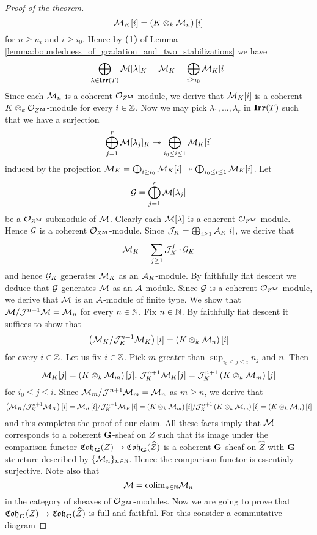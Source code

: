 \begin{proof}[Proof of the theorem]
$${\mathcal M}_K[i] = \left(K\otimes_k{\mathcal M}_n\right)[i]$$
for $n\geq n_i$ and $i\geq i_0$. Hence by \textbf{(1)} of Lemma \ref{lemma:boundedness_of_gradation_and_two_stabilizations} we have
$$\bigoplus_{\lambda\in \mathbf{Irr}(T)}{\mathcal M}[\lambda]_K = {\mathcal M}_K = \bigoplus_{i\geq i_0}{\mathcal M}_K[i]$$
Since each ${\mathcal M}_n$ is a coherent ${\mathcal O}_{Z^{\mathbf{M}}}$-module, we derive that ${\mathcal M}_K[i]$ is a coherent $K\otimes_k{\mathcal O}_{Z^{\mathbf{M}}}$-module for every $i\in {\mathbb Z}$. Now we may pick $\lambda_1,...,\lambda_r$ in $\mathbf{Irr}(T)$ such that we have a surjection
$$\bigoplus_{j=1}^r{\mathcal M}[\lambda_j]_K \twoheadrightarrow \bigoplus_{i_0\leq i\leq 1}{\mathcal M}_K[i]$$
induced by the projection ${\mathcal M}_K = \bigoplus_{i\geq i_0}{\mathcal M}_K[i]\twoheadrightarrow \bigoplus_{i_0\leq i\leq 1}{\mathcal M}_K[i]$. Let
$${\mathcal G} = \bigoplus_{j=1}^r{\mathcal M}[\lambda_j]$$
be a ${\mathcal O}_{Z^{\mathbf{M}}}$-submodule of ${\mathcal M}$. Clearly each ${\mathcal M}[\lambda]$ is a coherent ${\mathcal O}_{Z^{\mathbf{M}}}$-module. Hence ${\mathcal G}$ is a coherent ${\mathcal O}_{Z^{\mathbf{M}}}$-module. Since ${\mathcal J}_K = \bigoplus_{i\geq 1}{\mathcal A}_K[i]$, we derive that
$${\mathcal M}_K = \sum_{j\geq 1}{\mathcal J}_K^j\cdot {\mathcal G}_K$$
and hence ${\mathcal G}_K$ generates ${\mathcal M}_K$ as an ${\mathcal A}_K$-module. By faithfully flat descent we deduce that ${\mathcal G}$ generates ${\mathcal M}$ as an ${\mathcal A}$-module. Since ${\mathcal G}$ is a coherent ${\mathcal O}_{Z^{\mathbf{M}}}$-module, we derive that ${\mathcal M}$ is an ${\mathcal A}$-module of finite type. We show that  ${\mathcal M}/{\mathcal J}^{n+1}{\mathcal M} = {\mathcal M}_{n}$ for every $n\in {\mathbb N}$. Fix $n\in {\mathbb N}$. By faithfully flat descent it suffices to show that
$$\left({\mathcal M}_K/{\mathcal J}_K^{n+1}{\mathcal M}_K\right)[i] = \left(K\otimes_k{\mathcal M}_n\right)[i]$$
for every $i\in {\mathbb Z}$. Let us fix $i\in {\mathbb Z}$. Pick $m$ greater than $\sup_{i_0\leq j\leq i}n_j$ and $n$. Then
$${\mathcal M}_K[j] = \left(K\otimes_k{\mathcal M}_m\right)[j],\,{\mathcal J}_K^{n+1}{\mathcal M}_K[j] = {\mathcal J}_K^{n+1}\left(K\otimes_k {\mathcal M}_m\right)[j]$$
for $i_0\leq j\leq i$. Since ${\mathcal M}_m/{\mathcal J}^{n+1}{\mathcal M}_m = {\mathcal M}_n$ as $m \geq n$, we derive that
$$\left({\mathcal M}_K/{\mathcal J}_K^{n+1}{\mathcal M}_K\right)[i] = {\mathcal M}_K[i]/{\mathcal J}_K^{n+1}{\mathcal M}_K[i] = \left(K\otimes_k{\mathcal M}_m\right)[i]/{\mathcal J}_K^{n+1}\left(K\otimes_k {\mathcal M}_m\right)[i] = \left(K\otimes_k{\mathcal M}_n\right)[i]$$
and this completes the proof of our claim. All these facts imply that ${\mathcal M}$ corresponds to a coherent $\mathbf{G}$-sheaf on $Z$ such that its image under the comparison functor $\mathfrak{Coh}_{\mathbf{G}}(Z)\rightarrow \mathfrak{Coh}_{\mathbf{G}}(\widehat{Z})$ is a coherent $\mathbf{G}$-sheaf on $\widehat{Z}$ with $\mathbf{G}$-structure described by $\{{\mathcal M}_n\}_{n\in {\mathbb N}}$. Hence the comparison functor is essentialy surjective. Note also that
$${\mathcal M} = \mathrm{colim}_{n\in {\mathbb N}}{\mathcal M}_n$$
in the category of sheaves of ${\mathcal O}_{Z^{\mathbf{M}}}$-modules. Now we are going to prove that $\mathfrak{Coh}_{\mathbf{G}}(Z)\rightarrow \mathfrak{Coh}_{\mathbf{G}}(\widehat{Z})$ is full and faithful. For this consider a commutative diagram

\end{proof}

